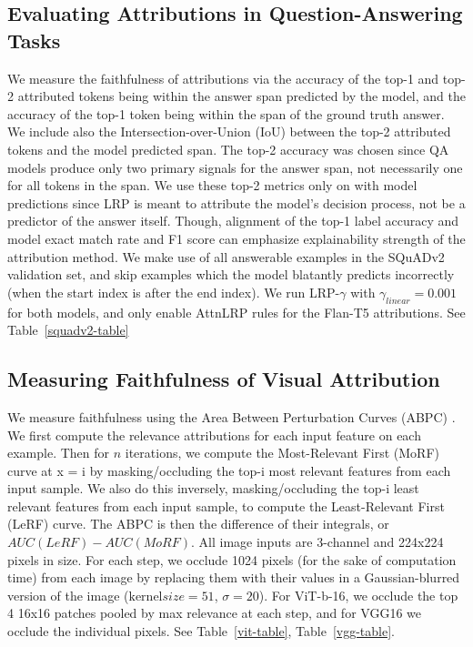 \documentclass{article}
\begin{document}
\subsection{Evaluating Attributions in Question-Answering Tasks}
We measure the faithfulness of attributions via the accuracy of the top-1 and top-2 attributed tokens being within the answer span predicted
by the model, and the accuracy of the top-1 token being within the span of the ground truth answer. We include also the Intersection-over-Union
(IoU) between the top-2 attributed tokens and the model predicted span. The top-2 accuracy was chosen since QA models produce only two primary
signals for the answer span, not necessarily one for all tokens in the span. We use these top-2 metrics only on with model predictions since
LRP is meant to attribute the model's decision process, not be a predictor of the answer itself. Though, alignment of the top-1 label accuracy
and model exact match rate and F1 score can emphasize explainability strength of the attribution method.
We make use of all answerable examples in the SQuADv2 validation set, and skip examples which the model blatantly predicts incorrectly (when
the start index is after the end index). We run LRP-$\gamma$ with $\gamma_{linear} = 0.001$ for both models, and only enable AttnLRP rules
for the Flan-T5 attributions. See Table~\ref{squadv2-table}

\subsection{Measuring Faithfulness of Visual Attribution}
We measure faithfulness using the Area Between Perturbation Curves (ABPC) \cite{schulz2020abpc, blucher2024pixelflipping}.
We first compute the relevance attributions for each input feature on each example. Then for $n$ iterations, we compute the
Most-Relevant First (MoRF) curve at x = i by masking/occluding the top-i most relevant features from each input sample. We also do this inversely,
masking/occluding the top-i least relevant features from each input sample, to compute the Least-Relevant First (LeRF) curve.
The ABPC is then the difference of their integrals, or $AUC(LeRF) - AUC(MoRF)$.
All image inputs are 3-channel and 224x224 pixels in size. For each step, we occlude 1024 pixels (for the sake of computation time) from each
image by replacing them with their values in a Gaussian-blurred version of the image ($\text{kernel} size=51$, $\sigma=20$). For ViT-b-16, we occlude
the top 4 16x16 patches pooled by max relevance at each step, and for VGG16 we occlude the individual pixels. See Table~\ref{vit-table},
Table~\ref{vgg-table}.
\end{document}
